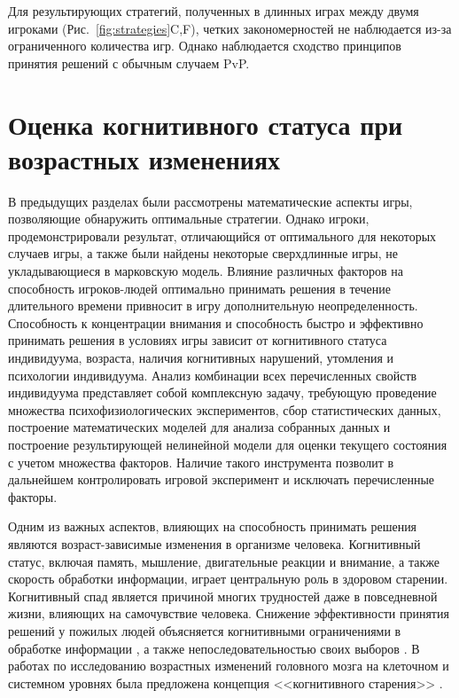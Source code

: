 Для результирующих стратегий, полученных в длинных играх между двумя игроками (Рис.~\cref{fig:strategies}C,F), четких закономерностей не наблюдается из-за ограниченного количества игр. Однако наблюдается сходство принципов принятия решений с обычным случаем PvP.

\section{Оценка когнитивного статуса при возрастных изменениях}\label{sec:ch3/sec5}

В предыдущих разделах были рассмотрены математические аспекты игры, позволяющие обнаружить оптимальные стратегии. Однако игроки, продемонстрировали результат, отличающийся от оптимального для некоторых случаев игры, а также были найдены некоторые сверхдлинные игры, не укладывающиеся в марковскую модель. Влияние различных факторов на способность игроков-людей оптимально принимать решения в течение длительного времени привносит в игру дополнительную неопределенность. Способность к концентрации внимания и способность быстро и эффективно принимать решения в условиях игры зависит от когнитивного статуса индивидуума, возраста, наличия когнитивных нарушений, утомления и психологии индивидуума. Анализ комбинации всех перечисленных свойств индивидуума представляет собой комплексную задачу, требующую проведение множества психофизиологических экспериментов, сбор статистических данных, построение математических моделей для анализа собранных данных и построение результирующей нелинейной модели для оценки текущего состояния с учетом множества факторов. Наличие такого инструмента позволит в дальнейшем контролировать игровой эксперимент и исключать перечисленные факторы. 

Одним из важных аспектов, влияющих на способность принимать решения являются возраст-зависимые изменения в организме человека. Когнитивный статус, включая память, мышление, двигательные реакции и внимание, а также скорость обработки информации, играет центральную роль в здоровом старении. Когнитивный спад является причиной многих трудностей даже в повседневной жизни, влияющих на самочувствие человека. Снижение эффективности принятия решений у пожилых людей объясняется когнитивными ограничениями в обработке информации \cite{10.1016/j.cognition.2015.05.004}, а также непоследовательностью своих выборов \cite{10.1037/0882-7974.20.1.71}. В работах по исследованию возрастных изменений головного мозга на клеточном и системном уровнях была предложена концепция <<когнитивного старения>> \cite{10.1353/pbm.2017.0043}.


